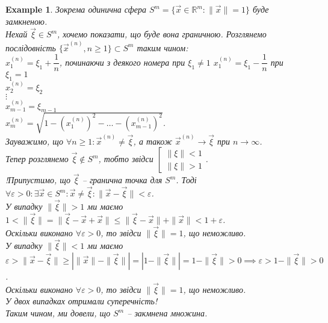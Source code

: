 \documentclass[a4paper, 10pt]{article}
\theoremstyle{theoremdd}
\theoremstyle{theoremdd}
\theoremstyle{theoremdd}
\theoremstyle{theoremdd}
\theoremstyle{theoremdd}
\newtheorem{example}[theorem]{Example}
\theoremstyle{theoremdd}
\theoremstyle{theoremdd}
\theoremstyle{theoremdd}
\theoremstyle{theoremdd}
\newcommand\Norm[1]{\|#1\|}
\begin{document}
\begin{example}
Зокрема одинична сфера $S^m = \{ \vec{x} \in \mathbb{R}^m: \Norm{\vec{x}} = 1 \}$ буде замкненою.\\
Нехай $\vec{\xi} \in S^m$, хочемо показати, що буде вона граничною. Розглянемо послідовність $\{ \vec{x}^{(n)}, n \geq 1 \} \subset S^m$ таким чином:\\
$x_1^{(n)} = \xi_1 + \dfrac{1}{n}$, починаючи з деякого номера при $\xi_1 \neq 1$ \hspace{2cm} $x_1^{(n)} = \xi_1 - \dfrac{1}{n}$ при $\xi_1 = 1$\\
$x_2^{(n)} = \xi_2$\\
$\vdots$\\
$x_{m-1}^{(n)} = \xi_{m-1}$\\
$x_m^{(n)} = \sqrt{1-\left(x_1^{(n)}\right)^2 - \dots - \left(x_{m-1}^{(n)}\right)^2}$.\\
Зауважимо, що $\forall n \geq 1: \vec{x}^{(n)} \neq \vec{\xi}$, а також $\vec{x}^{(n)} \to \vec{\xi}$ при $n \to \infty$.\\
Тепер розглянемо $\vec{\xi} \not\in S^m$, тобто звідси $\left[\begin{gathered} \Norm{\xi} < 1 \\ \Norm{\xi} > 1 \end{gathered} \right.$.\\
!Припустимо, що $\vec{\xi}$ -- гранична точка для $S^m$. Тоді $\forall \varepsilon > 0: \exists \vec{x} \in S^m: \vec{x} \neq \vec{\xi}: \Norm{\vec{x}-\vec{\xi}} < \varepsilon$.\\
У випадку $\Norm{\vec{\xi}} > 1$ ми маємо 
$1 < \Norm{\vec{\xi}} = \Norm{\vec{\xi} - \vec{x} + \vec{x}} \leq \Norm{\vec{\xi} - \vec{x}} + \Norm{\vec{x}} < 1 + \varepsilon$.\\
Оскільки виконано $\forall \varepsilon > 0$, то звідси $\Norm{\vec{\xi}} = 1$, що неможливо.\\
У випадку $\Norm{\vec{\xi}} < 1$ ми маємо $\varepsilon > \Norm{\vec{x} - \vec{\xi}} \geq | \Norm{\vec{x}} - \Norm{\vec{\xi}} | = | 1 - \Norm{\vec{\xi}} | = 1 - \Norm{\vec{\xi}} > 0 \implies \varepsilon > 1 - \Norm{\vec{\xi}} > 0$.\\
Оскільки виконано $\forall \varepsilon > 0$, то звідси $\Norm{\vec{\xi}} = 1$, що неможливо.\\
У двох випадках отримали суперечність!\\
Таким чином, ми довели, що $S^m$ -- закмнена множина.
\end{example}
\end{document}
